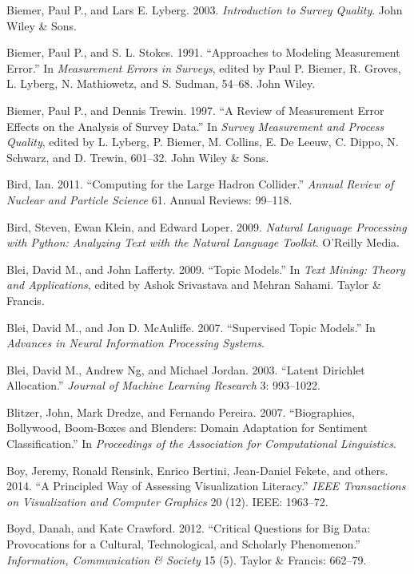 \documentclass[]{krantz}
\begin{document}
\hypertarget{ref-biemer2003}{}
Biemer, Paul P., and Lars E. Lyberg. 2003. \emph{Introduction to Survey
Quality}. John Wiley \& Sons.

\hypertarget{ref-BiemerStokes1991}{}
Biemer, Paul P., and S. L. Stokes. 1991. ``Approaches to Modeling
Measurement Error.'' In \emph{Measurement Errors in Surveys}, edited by
Paul P. Biemer, R. Groves, L. Lyberg, N. Mathiowetz, and S. Sudman,
54--68. John Wiley.

\hypertarget{ref-biemer1997review}{}
Biemer, Paul P., and Dennis Trewin. 1997. ``A Review of Measurement
Error Effects on the Analysis of Survey Data.'' In \emph{Survey
Measurement and Process Quality}, edited by L. Lyberg, P. Biemer, M.
Collins, E. De Leeuw, C. Dippo, N. Schwarz, and D. Trewin, 601--32. John
Wiley \& Sons.

\hypertarget{ref-bird2011computing}{}
Bird, Ian. 2011. ``Computing for the Large Hadron Collider.''
\emph{Annual Review of Nuclear and Particle Science} 61. Annual Reviews:
99--118.

\hypertarget{ref-bird-09}{}
Bird, Steven, Ewan Klein, and Edward Loper. 2009. \emph{Natural Language
Processing with Python: Analyzing Text with the Natural Language
Toolkit}. O'Reilly Media.

\hypertarget{ref-blei-09}{}
Blei, David M., and John Lafferty. 2009. ``Topic Models.'' In \emph{Text
Mining: Theory and Applications}, edited by Ashok Srivastava and Mehran
Sahami. Taylor \& Francis.

\hypertarget{ref-blei-07b}{}
Blei, David M., and Jon D. McAuliffe. 2007. ``Supervised Topic Models.''
In \emph{Advances in Neural Information Processing Systems}.

\hypertarget{ref-blei-03}{}
Blei, David M., Andrew Ng, and Michael Jordan. 2003. ``Latent Dirichlet
Allocation.'' \emph{Journal of Machine Learning Research} 3: 993--1022.

\hypertarget{ref-blitzer-07}{}
Blitzer, John, Mark Dredze, and Fernando Pereira. 2007. ``Biographies,
Bollywood, Boom-Boxes and Blenders: Domain Adaptation for Sentiment
Classification.'' In \emph{Proceedings of the Association for
Computational Linguistics}.

\hypertarget{ref-boy2014principled}{}
Boy, Jeremy, Ronald Rensink, Enrico Bertini, Jean-Daniel Fekete, and
others. 2014. ``A Principled Way of Assessing Visualization Literacy.''
\emph{IEEE Transactions on Visualization and Computer Graphics} 20 (12).
IEEE: 1963--72.

\hypertarget{ref-boyd2012critical}{}
Boyd, Danah, and Kate Crawford. 2012. ``Critical Questions for Big Data:
Provocations for a Cultural, Technological, and Scholarly Phenomenon.''
\emph{Information, Communication \& Society} 15 (5). Taylor \& Francis:
662--79.
\end{document}
